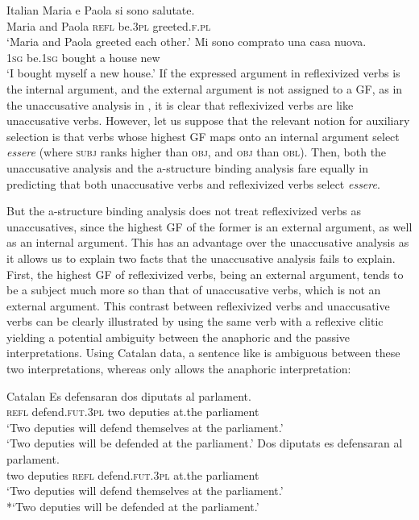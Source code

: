 \documentclass[output=paper,hidelinks]{langscibook}
\begin{document}
\ea\label{ex:Romance:30}  Italian \citep{Katerinov1975}
\ea\label{ex:Romance:30a}
\gll
Maria e Paola si sono salutate.\\
Maria and Paola \textsc{refl} be.\textsc{3pl} greeted.\textsc{f.pl}\\
\glt   `Maria and Paola greeted each other.'
\ex\label{ex:Romance:30b}
\gll
Mi sono comprato una casa nuova.\\
\textsc{1sg} be.\textsc{1sg} bought a house new\\
\glt   `I bought myself a new house.'
\z\z
If the expressed argument in reflexivized verbs is the internal argument, and the external argument is not assigned to a GF, as in the unaccusative analysis in , it is clear that reflexivized verbs are like unaccusative verbs. However, let us suppose that the relevant notion for auxiliary selection is that verbs whose highest GF maps onto an internal argument select \textit{essere} (where \textsc{subj} ranks higher than \textsc{obj}, and \textsc{obj} than \textsc{obl}). Then, both the unaccusative analysis and the a-structure binding analysis fare equally in predicting that both unaccusative verbs and reflexivized verbs select \textit{essere}. 

But the a-structure binding analysis does not treat reflexivized verbs as unaccusatives, since the highest GF of the former is an external argument, as well as an internal argument. This has an advantage over the unaccusative analysis as it allows us to explain two facts that the unaccusative analysis fails to explain. First, the highest GF of reflexivized verbs, being an external argument, tends to be a subject much more so than that of unaccusative verbs, which is not an external argument. This contrast between reflexivized verbs and unaccusative verbs can be clearly illustrated by using the same verb with a reflexive clitic yielding a potential ambiguity between the anaphoric and the passive interpretations. Using Catalan data, a sentence like  is ambiguous between these two interpretations, whereas  only allows the anaphoric interpretation:

\ea\label{ex:Romance:31}Catalan
\ea\label{ex:Romance:31a}
\gll Es defensaran dos diputats al parlament.\\
       \textsc{refl} defend.\textsc{fut.3pl} two deputies at.the parliament\\
\glt`Two deputies will defend themselves at the parliament.'\\
   `Two deputies will be defended at the parliament.'
\ex\label{ex:Romance:31b}
\gll
Dos diputats es defensaran al parlament.\\
 two deputies \textsc{refl} defend.\textsc{fut.3pl} at.the parliament\\
\glt`Two deputies will defend themselves at the parliament.'\\
   *`Two deputies will be defended at the parliament.'
\z\z
\end{document}
